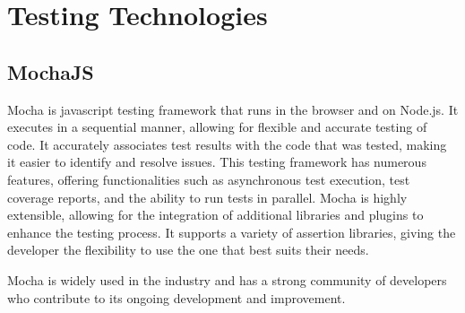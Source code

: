 \section{Testing Technologies}

\subsection{MochaJS}

Mocha is javascript testing framework that runs in the browser and on Node.js. It executes in a sequential manner, allowing for flexible and accurate testing of code. It accurately 
associates test results with the code that was tested, making it easier to identify and resolve issues. 
This testing framework has numerous features, offering functionalities such as asynchronous test execution, test coverage reports, and the ability to run tests in parallel.
Mocha is highly extensible, allowing for the integration of additional libraries and plugins to enhance the testing process. It supports a
variety of assertion libraries, giving the developer the flexibility to use the one that best suits their needs. 

Mocha is widely used in the industry and has a strong community of developers who contribute to its ongoing development and improvement. \cite{mocha}

